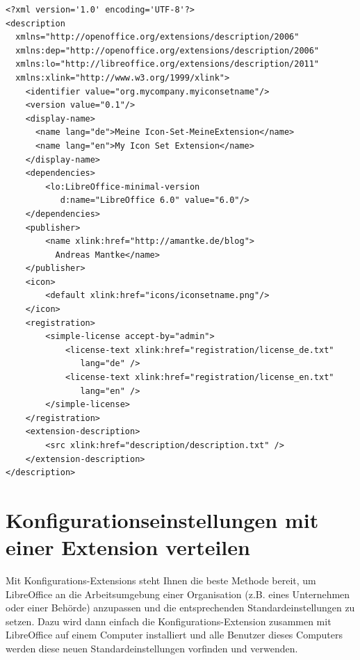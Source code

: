 \documentclass[a4paper,10pt,pagesize,titlepage]{scrbook}
\begin{document}
\begin{lstlisting}
<?xml version='1.0' encoding='UTF-8'?>
<description
  xmlns="http://openoffice.org/extensions/description/2006"
  xmlns:dep="http://openoffice.org/extensions/description/2006"
  xmlns:lo="http://libreoffice.org/extensions/description/2011"
  xmlns:xlink="http://www.w3.org/1999/xlink">
    <identifier value="org.mycompany.myiconsetname"/>
    <version value="0.1"/>
    <display-name>
      <name lang="de">Meine Icon-Set-MeineExtension</name>
      <name lang="en">My Icon Set Extension</name>
    </display-name>
    <dependencies>
        <lo:LibreOffice-minimal-version 
           d:name="LibreOffice 6.0" value="6.0"/>
    </dependencies>
    <publisher>
        <name xlink:href="http://amantke.de/blog">
          Andreas Mantke</name>
    </publisher>
    <icon>
        <default xlink:href="icons/iconsetname.png"/>
    </icon>
    <registration>
        <simple-license accept-by="admin">
            <license-text xlink:href="registration/license_de.txt" 
               lang="de" />
            <license-text xlink:href="registration/license_en.txt" 
               lang="en" />
        </simple-license>
    </registration>
    <extension-description>
        <src xlink:href="description/description.txt" />
    </extension-description>
</description>
\end{lstlisting}

\chapter{Konfigurationseinstellungen mit einer Extension verteilen}

Mit Konfigurations-Extensions steht Ihnen die beste Methode bereit, um LibreOffice an die Arbeitsumgebung einer Organisation (z.B. eines Unternehmen oder einer Behörde) anzupassen und die entsprechenden Standardeinstellungen zu setzen. Dazu wird dann einfach die Konfigurations-Extension zusammen mit LibreOffice auf einem Computer installiert und alle Benutzer dieses Computers werden diese neuen Standardeinstellungen vorfinden und verwenden.
\end{document}
